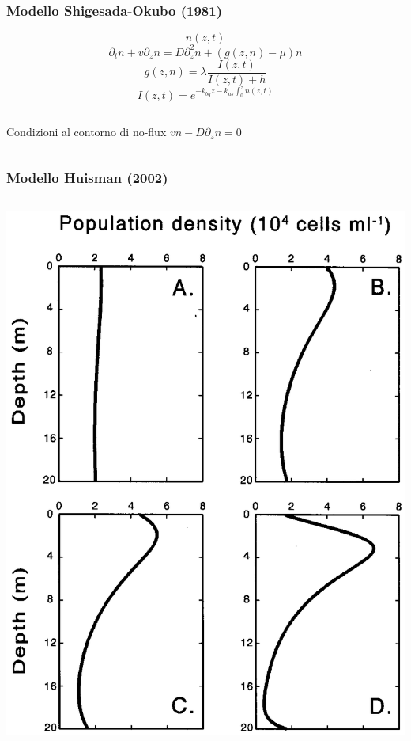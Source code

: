 \begin{frame}
  \frametitle{Modello Shigesada-Okubo (1981)}
  \[ n(z,t) \]
  \[ \partial_t n + v \partial_z n = D \partial_z^2 n + (g(z,n) - \mu) n \]
  \[ g(z,n) =  \lambda \frac{I(z,t)}{I(z,t)+h} \]
  \[ I(z,t) = e^{-k_{bg} z - k_{as}\int_0^z n(z,t) } \]

  \begin{columns}
    \begin{block}{Condizioni al contorno di no-flux}
      \( v n - D \partial_z n = 0\)
    \end{block}
  \end{columns}
\end{frame}

\begin{frame}
  \frametitle{Modello Huisman (2002)}
  \begin{columns}
    \includegraphics[width=\textwidth]{../img/pl_peak_Huis}


\end{columns}
\end{frame}
